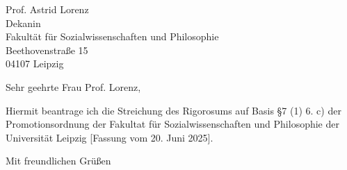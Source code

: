 \documentclass[fontsize=11pt, foldmarks = false]{scrlttr2}
\begin{document}
\begin{letter}{
    Prof. Astrid Lorenz\\
    Dekanin\\
    Fakultät für Sozialwissenschaften und Philosophie\\
    Beethovenstraße 15\\
    04107 Leipzig
}


\opening{Sehr geehrte Frau Prof. Lorenz,}

Hiermit beantrage ich die Streichung des Rigorosums auf Basis §7 (1)
6. c) der Promotionsordnung der Fakultat für Sozialwissenschaften und
Philosophie der Universität Leipzig [Fassung vom 20. Juni 2025].

\closing{Mit freundlichen Grüßen}

\end{letter}
\end{document}
